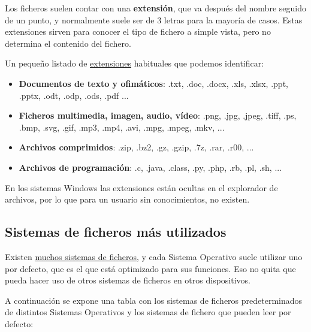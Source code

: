 Los ficheros suelen contar con una \textbf{extensión}, que va después del nombre seguido de un punto, y normalmente suele ser de 3 letras para la mayoría de casos. Estas extensiones sirven para conocer el tipo de fichero a simple vista, pero no determina el contenido del fichero.


Un pequeño listado de  \href{https://en.wikipedia.org/wiki/List_of_filename_extensions}{extensiones}  habituales que podemos identificar:

\begin{itemize}
    \item \textbf{Documentos de texto y ofimáticos}: .txt, .doc, .docx, .xls, .xlsx, .ppt, .pptx, .odt, .odp, .ods, .pdf ...
    \item \textbf{Ficheros multimedia, imagen, audio, vídeo}: .png, .jpg, .jpeg, .tiff, .ps, .bmp, .svg, .gif, .mp3, .mp4, .avi, .mpg, .mpeg, .mkv, ...
    \item \textbf{Archivos comprimidos}: .zip, .bz2, .gz, .gzip, .7z, .rar, .r00, ...
    \item \textbf{Archivos de programación}: .c, .java, .class, .py, .php, .rb, .pl, .sh, ...
\end{itemize}

En los sistemas Windows las extensiones están ocultas en el explorador de archivos, por lo que para un usuario sin conocimientos, no existen.



\subsection{Sistemas de ficheros más utilizados}

Existen \href{https://en.wikipedia.org/wiki/List_of_file_systems}{muchos sistemas de ficheros}, y cada Sistema Operativo suele utilizar uno por defecto, que es el que está optimizado para sus funciones. Eso no quita que pueda hacer uso de otros sistemas de ficheros en otros dispositivos.


A continuación se expone una tabla con los sistemas de ficheros predeterminados de distintos Sistemas Operativos y los sistemas de fichero que pueden leer por defecto:

